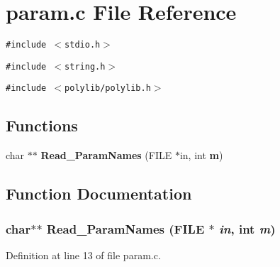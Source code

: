 \section{param.c File Reference}
\label{param_8c}
{\tt \#include $<$stdio.h$>$}\par
{\tt \#include $<$string.h$>$}\par
{\tt \#include $<$polylib/polylib.h$>$}\par
\subsection*{Functions}
\begin{CompactItemize}
\item 
char $\ast$$\ast$ {\bf Read\_\-Param\-Names} (FILE $\ast$in, int {\bf m})
\end{CompactItemize}


\subsection{Function Documentation}
\subsubsection{\setlength{\rightskip}{0pt plus 5cm}char$\ast$$\ast$ Read\_\-Param\-Names (FILE $\ast$ {\em in}, int {\em m})}\label{param_8c_a0}




Definition at line 13 of file param.c.